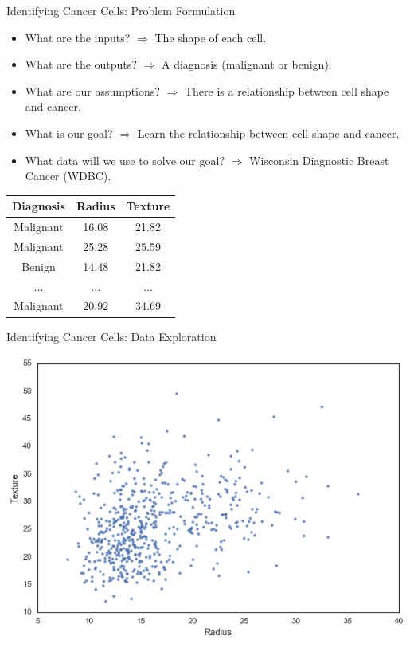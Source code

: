 \documentclass[8pt,aspectratio=169]{beamer}
\begin{document}
\begin{frame}{Identifying Cancer Cells: Problem Formulation}

\begin{itemize}
\pause \item What are the inputs? \pause $\Rightarrow$ The shape of each cell.
\pause \item What are the outputs? \pause $\Rightarrow$ A diagnosis (malignant or benign).
\pause \item What are our assumptions? \pause $\Rightarrow$ There is a relationship between cell shape and cancer.
\pause \item What is our goal? \pause $\Rightarrow$ Learn the relationship between cell shape and cancer.
\pause \item What data will we use to solve our goal? \pause $\Rightarrow$ Wisconsin Diagnostic Breast Cancer (WDBC).
\end{itemize}

\vspace{2mm}

\pause
\begin{center}
 \begin{tabular}{|c c c|} 
 \hline
 Diagnosis & Radius & Texture \\ [0.25ex] 
 \hline
 Malignant & 16.08 & 21.82 \\
 Malignant & 25.28 & 25.59 \\
 Benign    & 14.48 & 21.82 \\
 ...       & ...   & ...   \\
 Malignant & 20.92 & 34.69 \\ [1ex] \hline
\end{tabular}
\end{center}

\end{frame}


\begin{frame}{Identifying Cancer Cells: Data Exploration}

\pause
\begin{center}
\includegraphics[scale=0.40]{figures/cancer-scatter-plot}
\end{center}

\end{frame}
\end{document}
